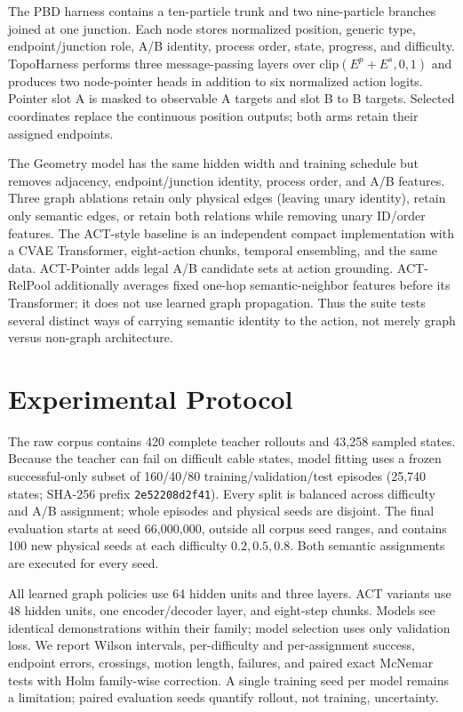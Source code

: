 \documentclass[journal]{IEEEtran}
\begin{document}
The PBD harness \cite{muller2007pbd} contains a ten-particle trunk and two
nine-particle branches joined at one junction.  Each node stores normalized
position, generic type, endpoint/junction role, A/B identity, process order,
state, progress, and difficulty.  TopoHarness performs three message-passing
layers over $\mathrm{clip}(E^p+E^s,0,1)$ and produces two node-pointer heads in
addition to six normalized action logits.  Pointer slot A is masked to
observable A targets and slot B to B targets.  Selected coordinates replace
the continuous position outputs; both arms retain their assigned endpoints.

The Geometry model has the same hidden width and training schedule but removes
adjacency, endpoint/junction identity, process order, and A/B features.  Three
graph ablations retain only physical edges (leaving unary identity), retain
only semantic edges, or retain both relations while removing unary ID/order
features.  The ACT-style baseline is an independent compact implementation
with a CVAE Transformer, eight-action chunks, temporal ensembling, and the same
data.  ACT-Pointer adds legal A/B candidate sets at action grounding.
ACT-RelPool additionally averages fixed one-hop semantic-neighbor features
before its Transformer; it does not use learned graph propagation.  Thus the
suite tests several distinct ways of carrying semantic identity to the action,
not merely graph versus non-graph architecture.

\section{Experimental Protocol}

The raw corpus contains 420 complete teacher rollouts and 43,258 sampled
states.  Because the teacher can fail on difficult cable states, model fitting
uses a frozen successful-only subset of 160/40/80 training/validation/test
episodes (25,740 states; SHA-256 prefix \texttt{2e52208d2f41}).  Every split is
balanced across difficulty and A/B assignment; whole episodes and physical
seeds are disjoint.  The final evaluation starts at seed 66,000,000, outside
all corpus seed ranges, and contains 100 new physical seeds at each difficulty
$0.2,0.5,0.8$.  Both semantic assignments are executed for every seed.

All learned graph policies use 64 hidden units and three layers.  ACT variants
use 48 hidden units, one encoder/decoder layer, and eight-step chunks.  Models
see identical demonstrations within their family; model selection uses only
validation loss.  We report Wilson intervals, per-difficulty and per-assignment
success, endpoint errors, crossings, motion length, failures, and paired exact
McNemar tests with Holm family-wise correction.  A single training seed per
model remains a limitation; paired evaluation seeds quantify rollout, not
training, uncertainty.
\end{document}
